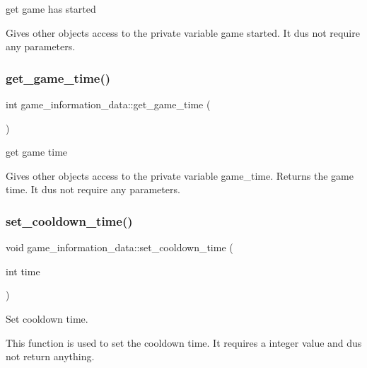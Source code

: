 get game has started 

Gives other objects access to the private variable game started. It dus not require any parameters. \hypertarget{classgame__information__data_ad63a9f9e72242aa68cef64d53ce52249}{}\label{classgame__information__data_ad63a9f9e72242aa68cef64d53ce52249} 
\subsubsection{\texorpdfstring{get\+\_\+game\+\_\+time()}{get\_game\_time()}}
{\footnotesize\ttfamily int game\+\_\+information\+\_\+data\+::get\+\_\+game\+\_\+time (\begin{DoxyParamCaption}{ }\end{DoxyParamCaption})\hspace{0.3cm}{\ttfamily [inline]}}



get game time 

Gives other objects access to the private variable game\+\_\+time. Returns the game time. It dus not require any parameters. \hypertarget{classgame__information__data_ab690a619ee210b5660017d8a57ed630a}{}\label{classgame__information__data_ab690a619ee210b5660017d8a57ed630a} 
\subsubsection{\texorpdfstring{set\+\_\+cooldown\+\_\+time()}{set\_cooldown\_time()}}
{\footnotesize\ttfamily void game\+\_\+information\+\_\+data\+::set\+\_\+cooldown\+\_\+time (\begin{DoxyParamCaption}\item[{int}]{time }\end{DoxyParamCaption})\hspace{0.3cm}{\ttfamily [inline]}}



Set cooldown time. 

This function is used to set the cooldown time. It requires a integer value and dus not return anything. \hypertarget{classgame__information__data_a4dbb7c0d6ba269942ba417c800c66c11}{}\label{classgame__information__data_a4dbb7c0d6ba269942ba417c800c66c11} 
